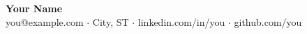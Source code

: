 \begin{center}
{\LARGE\bfseries Your Name}\\[4pt]
you@example.com $\cdot$ City, ST $\cdot$ linkedin.com/in/you $\cdot$ github.com/you
\end{center}
